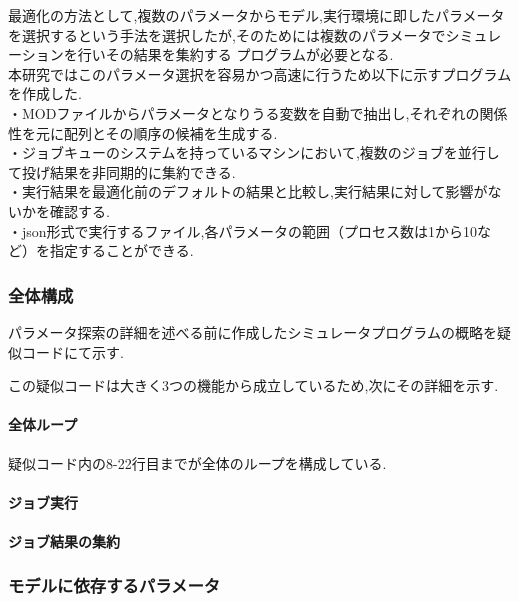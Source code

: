 最適化の方法として,複数のパラメータからモデル,実行環境に即したパラメータを選択するという手法を選択したが,そのためには複数のパラメータでシミュレーションを行いその結果を集約する
プログラムが必要となる.\\
本研究ではこのパラメータ選択を容易かつ高速に行うため以下に示すプログラムを作成した.\\
・MODファイルからパラメータとなりうる変数を自動で抽出し,それぞれの関係性を元に配列とその順序の候補を生成する.\\
・ジョブキューのシステムを持っているマシンにおいて,複数のジョブを並行して投げ結果を非同期的に集約できる.\\
・実行結果を最適化前のデフォルトの結果と比較し,実行結果に対して影響がないかを確認する.\\
・json形式で実行するファイル,各パラメータの範囲（プロセス数は1から10など）を指定することができる.\\
\subsubsection{全体構成}
パラメータ探索の詳細を述べる前に作成したシミュレータプログラムの概略を疑似コードにて示す.\\
{\footnotesize

}
この疑似コードは大きく3つの機能から成立しているため,次にその詳細を示す.\\
\paragraph{全体ループ}
疑似コード内の8-22行目までが全体のループを構成している.\\
{\footnotesize

}
\paragraph{ジョブ実行}
\paragraph{ジョブ結果の集約}

\subsubsection{モデルに依存するパラメータ}

